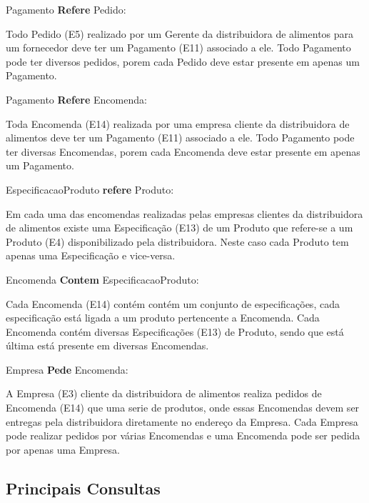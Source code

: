 \documentclass[12pt, onecolumn, titlepage]{article}
\begin{document}
\begin{description}
\item Pagamento \textbf{Refere} Pedido: 
\item \qquad Todo Pedido (E5) realizado por um Gerente da distribuidora de alimentos para um fornecedor deve ter um Pagamento (E11) associado a ele. Todo Pagamento pode ter diversos pedidos, porem cada Pedido deve estar presente em apenas um Pagamento.

\item Pagamento \textbf{Refere} Encomenda: 
\item \qquad Toda Encomenda (E14) realizada por uma empresa cliente da distribuidora de alimentos deve ter um Pagamento (E11) associado a ele. Todo Pagamento pode ter diversas Encomendas, porem cada Encomenda deve estar presente em apenas um Pagamento.

\item EspecificacaoProduto \textbf{refere} Produto: 
\item \qquad Em cada uma das encomendas realizadas pelas empresas clientes da distribuidora de alimentos existe uma Especificação (E13) de um Produto que refere-se a um Produto (E4) disponibilizado pela distribuidora. Neste caso cada Produto tem apenas uma Especificação e vice-versa. 

\item Encomenda \textbf{Contem} EspecificacaoProduto: 
\item \qquad Cada Encomenda (E14) contém contém um conjunto de especificações, cada especificação está ligada a um produto pertencente a Encomenda. Cada Encomenda contém diversas Especificações (E13) de Produto, sendo que está última está presente em diversas Encomendas.

\item Empresa \textbf{Pede} Encomenda: 
\item \qquad A Empresa (E3) cliente da distribuidora de alimentos realiza pedidos de Encomenda (E14) que uma serie de produtos, onde essas Encomendas devem ser entregas pela distribuidora diretamente no endereço da Empresa. Cada Empresa pode realizar pedidos por várias Encomendas e uma Encomenda pode ser pedida por apenas uma Empresa.

\end{description}

\subsection{Principais Consultas}
\label{sect:principaisConsultas}
\end{document}
